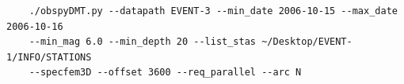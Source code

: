 \documentclass{article}
\newcommand{\ttilde}[0]{\raise.17ex\hbox{$\scriptstyle\sim$}}
\begin{document}
\begin{verbatim}
    ./obspyDMT.py --datapath EVENT-3 --min_date 2006-10-15 --max_date 2006-10-16 
    --min_mag 6.0 --min_depth 20 --list_stas ~/Desktop/EVENT-1/INFO/STATIONS 
    --specfem3D --offset 3600 --req_parallel --arc N
\end{verbatim}


\newpage

% 
% 
% 
% 
% 
% 
% 
% 
\end{document}
